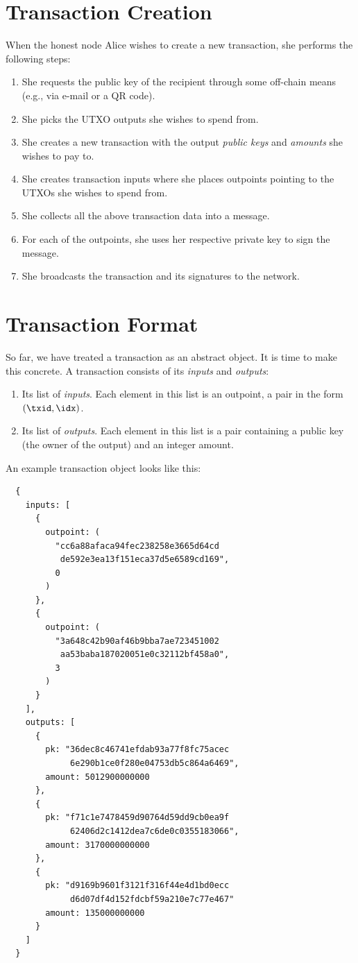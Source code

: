 \section{Transaction Creation}

When the honest node Alice wishes to create a new transaction, she performs the following steps:

\begin{enumerate}
  \item She requests the public key of the recipient through some off-chain means (e.g., via e-mail or a QR code).
  \item She picks the UTXO outputs she wishes to spend from.
  \item She creates a new transaction with the output \emph{public keys} and \emph{amounts} she wishes to pay to.
  \item She creates transaction inputs where she places outpoints pointing to the UTXOs she wishes to spend from.
  \item She collects all the above transaction data into a message.
  \item For each of the outpoints, she uses her respective private key to sign the message.
  \item She broadcasts the transaction and its signatures to the network.
\end{enumerate}

\section{Transaction Format}

So far, we have treated a transaction as an abstract object. It is time to make this concrete. A transaction
consists of its \emph{inputs} and \emph{outputs}:

\begin{enumerate}
  \item Its list of \emph{inputs}. Each element in this list is an outpoint, a pair in the form $(\txid, \idx)$.
  \item Its list of \emph{outputs}. Each element in this list is a pair containing a public key
        (the owner of the output) and an integer amount.
\end{enumerate}

An example transaction object looks like this:

\begin{verbatim}
  {
    inputs: [
      {
        outpoint: (
          "cc6a88afaca94fec238258e3665d64cd
           de592e3ea13f151eca37d5e6589cd169",
          0
        )
      },
      {
        outpoint: (
          "3a648c42b90af46b9bba7ae723451002
           aa53baba187020051e0c32112bf458a0",
          3
        )
      }
    ],
    outputs: [
      {
        pk: "36dec8c46741efdab93a77f8fc75acec
             6e290b1ce0f280e04753db5c864a6469",
        amount: 5012900000000
      },
      {
        pk: "f71c1e7478459d90764d59dd9cb0ea9f
             62406d2c1412dea7c6de0c0355183066",
        amount: 3170000000000
      },
      {
        pk: "d9169b9601f3121f316f44e4d1bd0ecc
             d6d07df4d152fdcbf59a210e7c77e467"
        amount: 135000000000
      }
    ]
  }
\end{verbatim}

